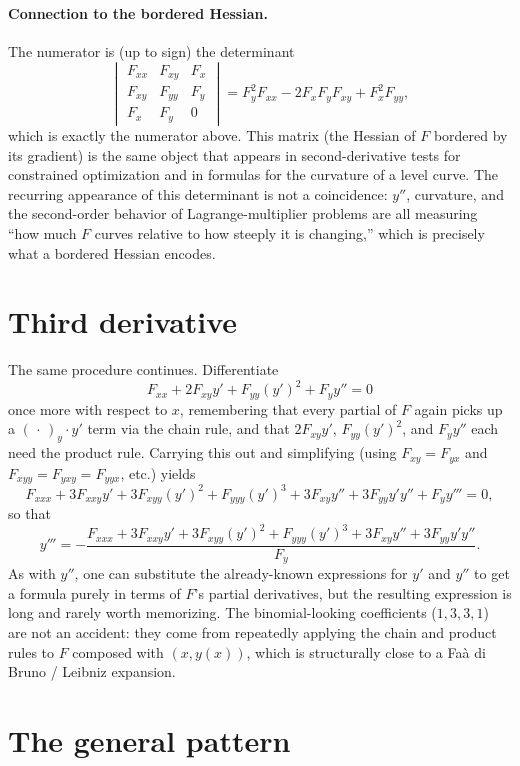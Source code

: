 \documentclass{essay}
\begin{document}
\paragraph{Connection to the bordered Hessian.} The numerator is (up to sign) the
determinant
\[
\begin{vmatrix}
F_{xx} & F_{xy} & F_x \\
F_{xy} & F_{yy} & F_y \\
F_x    & F_y    & 0
\end{vmatrix}
= F_y^2 F_{xx} - 2F_xF_yF_{xy} + F_x^2F_{yy},
\]
which is exactly the numerator above. This matrix (the Hessian of $F$ bordered by its
gradient) is the same object that appears in second-derivative tests for constrained
optimization and in formulas for the curvature of a level curve. The recurring appearance
of this determinant is not a coincidence: $y''$, curvature, and the second-order behavior of
Lagrange-multiplier problems are all measuring ``how much $F$ curves relative to how steeply
it is changing,'' which is precisely what a bordered Hessian encodes.

\section{Third derivative}

The same procedure continues. Differentiate
\[
F_{xx} + 2F_{xy}y' + F_{yy}(y')^2 + F_y y'' = 0
\]
once more with respect to $x$, remembering that every partial of $F$ again picks up a
$(\,\cdot\,)_y \cdot y'$ term via the chain rule, and that $2F_{xy}y'$, $F_{yy}(y')^2$, and
$F_y y''$ each need the product rule. Carrying this out and simplifying (using $F_{xy} =
F_{yx}$ and $F_{xyy} = F_{yxy} = F_{yyx}$, etc.) yields
\[
F_{xxx} + 3F_{xxy}y' + 3F_{xyy}(y')^2 + F_{yyy}(y')^3 + 3F_{xy}y'' + 3F_{yy}y'y'' + F_y y''' = 0,
\]
so that
\[
y''' = -\frac{F_{xxx} + 3F_{xxy}y' + 3F_{xyy}(y')^2 + F_{yyy}(y')^3 + 3F_{xy}y'' +
3F_{yy}y'y''}{F_y}.
\]
As with $y''$, one can substitute the already-known expressions for $y'$ and $y''$ to get a
formula purely in terms of $F$'s partial derivatives, but the resulting expression is long
and rarely worth memorizing. The binomial-looking coefficients ($1,3,3,1$) are not an
accident: they come from repeatedly applying the chain and product rules to $F$ composed
with $(x, y(x))$, which is structurally close to a Faà di Bruno / Leibniz expansion.

\section{The general pattern}
\end{document}
